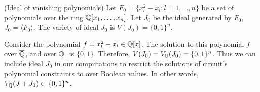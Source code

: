 


\begin{Definition} (Ideal of vanishing polynomials) 
Let $F_0 = \{x_l^2-x_l: l = 1,\dots,n\}$ be a set of polynomials over
the ring ${\mathbb{Q}}[x_1,\dots,x_n]$. Let $J_0$ be the ideal generated by
$F_0$, $J_0 = \langle F_0 \rangle$. The variety of ideal $J_0$ is
$V(J_0) = \{0,1\}^n$. 
\end{Definition}

Consider the polynomial $f = x_l^2 - x_l \in {\mathbb{Q}}[x]$. The solution to
this polynomial $f$ over $\overline{{\mathbb{Q}}}$, and over ${\mathbb{Q}}$, is
$\{0,1\}$. Therefore, $V(J_0) = V_\Q(J_0) = %
\{0,1\}^n$. Thus we can include ideal $J_0$ in our computations to
restrict the solutions of circuit's polynomial constraints to over
Boolean values. In other words, $V_{\mathbb{Q}}(J+J_0) \subset \{0,1\}^n$. 



